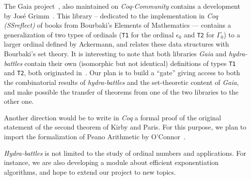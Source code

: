 \documentclass{easychair}
\begin{document}
The Gaia project~\cite{Gaia}, also maintained on \textit{Coq-Community} contains a development by José Grimm~\cite{grimm:hal-00911710}. This library -- dedicated  to the implementation in \textit{Coq (SSreflect)} of books from  Bourbaki's Elements of Mathematics --- contains a generalization of two types of ordinals (\texttt{T1} for the ordinal $\epsilon_0$ and
\texttt{T2} for $\Gamma_0$) to a larger ordinal defined by Ackermann, and relates these data structures with Bourbaki's set theory.
It is interesting to note that both libraries \textit{Gaia} and \textit{hydra-battles} contain their own (isomorphic but not identical) definitions of types \texttt{T1} and \texttt{T2}, both originated in~\cite{CantorContrib}.
Our plan is to build a  ``gate'' giving access to both the combinatorial results of \textit{hydra-battles} and the set-theoretic content of \textit{Gaia}, and make possible the transfer of theorems from one of the two libraries to the other one.

Another direction would be to write in \textit{Coq} a formal proof of the original statement of the second theorem of Kirby and Paris. For this purpose, we plan to import  the formalization of Peano Arithmetic by O'Connor~\cite{Goedel}.

 \emph{Hydra-battles} is not limited to the study of ordinal numbers and applications.
 For instance, we are also developing 
a module about efficient exponentiation algorithms, and hope
to extend our project to new topics.




\label{sect:bib}

%
%
%

\end{document}
